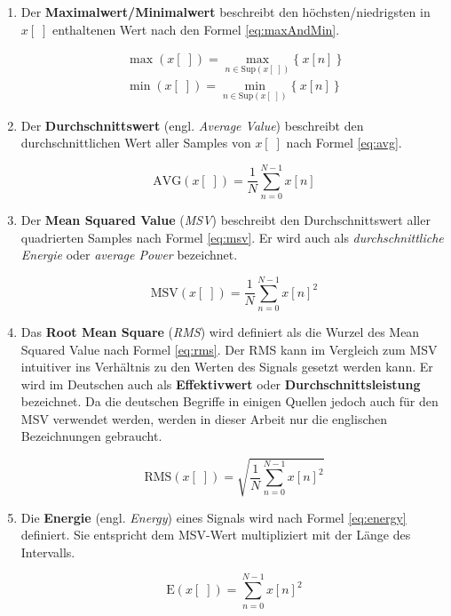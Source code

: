 \begin{enumerate}[leftmargin=*]
	
	\item Der \textbf{Maximalwert/Minimalwert} beschreibt den höchsten/niedrigsten in  $x[\;]$ enthaltenen Wert nach den Formel \ref{eq:maxAndMin}.
	
	\begin{equation}
	\begin{gathered}
	\max(x[\;]) = \max\limits_{n \in \text{Sup}(x[\;]) }\{\ x[n]\ \} \\ 
	\min(x[\;])= \min\limits_{n \in \text{Sup}(x[\;])}\{\ x[n]\ \}
	\end{gathered}
	\label{eq:maxAndMin}
	\end{equation}
	
	
	\item Der \textbf{Durchschnittswert} (engl. \emph{Average Value}) beschreibt den durchschnittlichen Wert aller Samples von $x[\;]$ nach Formel \ref{eq:avg}.
	
	\begin{equation}
	\text{AVG}(x[\;]) = \frac{1}{N} \sum_{n = 0}^{N-1} x[n]
	\label{eq:avg}
	\end{equation}
	
	\item Der \textbf{Mean Squared Value} (\emph{MSV}) beschreibt den Durchschnittswert aller quadrierten Samples nach Formel \ref{eq:msv}. Er wird auch als \emph{durchschnittliche Energie} oder \emph{average Power} bezeichnet.
	
	\begin{equation}
	\text{MSV}(x[\;]) = \frac{1}{N} \sum_{n = 0}^{N-1} x[n]^2
	\label{eq:msv}
	\end{equation}
	
	\item Das \textbf{Root Mean Square} (\emph{RMS}) wird definiert als die Wurzel des Mean Squared Value nach Formel \ref{eq:rms}. Der RMS kann im Vergleich zum MSV intuitiver ins Verhältnis zu den Werten des Signals gesetzt werden kann. Er wird im Deutschen auch als \textbf{Effektivwert} oder \textbf{Durchschnittsleistung} bezeichnet. Da die deutschen Begriffe in einigen Quellen jedoch auch für den MSV verwendet werden, werden in dieser Arbeit nur die englischen Bezeichnungen gebraucht.
	
	\begin{equation}
	\text{RMS}(x[\;]) = \sqrt{\frac{1}{N} \sum_{n = 0}^{N-1} x[n]^2}
	\label{eq:rms}
	\end{equation}
	
	\item Die \textbf{Energie} (engl. \emph{Energy}) eines Signals wird nach Formel \ref{eq:energy} definiert. Sie entspricht dem MSV-Wert multipliziert mit der Länge des Intervalls.\cite[S. 27-28]{dspMichigan}
	
	\begin{equation}
	\text{E}(x[\;]) = \sum_{n = 0}^{N-1} x[n]^2
	\label{eq:energy}
	\end{equation}
	
\end{enumerate}	

